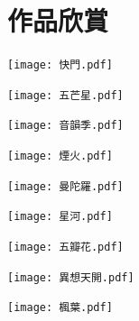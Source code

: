 \section{作品欣賞}
\begin{center}
\begin{figboxs}
\centering
\texttt{[image: 快門.pdf]}
\end{figboxs}
\end{center}
\newpage
\begin{center}
\begin{figboxs}
\centering
\texttt{[image: 五芒星.pdf]}
\end{figboxs}
\end{center}
\newpage
\begin{center}
\begin{figboxs}
\centering
\texttt{[image: 音韻季.pdf]}
\end{figboxs}
\end{center}
\newpage
\begin{center}
\begin{figboxs}
\centering
\texttt{[image: 煙火.pdf]}
\end{figboxs}
\end{center}
\newpage
\begin{center}
\begin{figboxs}
\centering
\texttt{[image: 曼陀羅.pdf]}
\end{figboxs}
\end{center}
\newpage
\begin{center}
\begin{figboxs}
\centering
\texttt{[image: 星河.pdf]}
\end{figboxs}
\end{center}
\newpage
\begin{center}
\begin{figboxs}
\centering
\texttt{[image: 五瓣花.pdf]}
\end{figboxs}
\end{center}
\newpage
\begin{center}
\begin{figboxs}
\centering
\texttt{[image: 異想天開.pdf]}
\end{figboxs}
\end{center}
\newpage
\begin{center}
\begin{figboxs}
\centering
\texttt{[image: 楓葉.pdf]}
\end{figboxs}
\end{center}
\newpage
\newpage
\newpage

